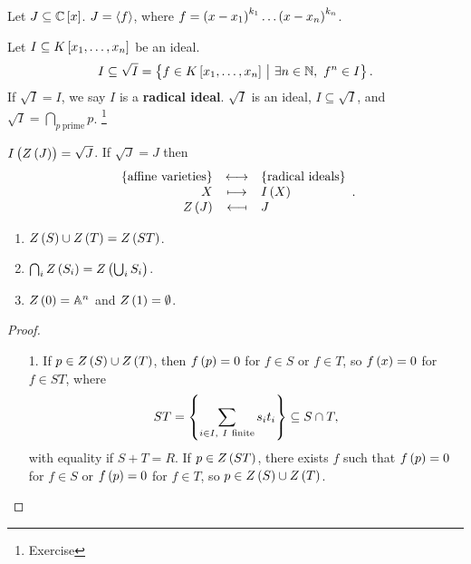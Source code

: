 \pagebreak

\begin{example}
Let $ J \subseteq \CC\sbr{x} $. $ J = \left\langle f \right\rangle $, where $ f = \br{x - x_1}^{k_1} \dots \br{x - x_n}^{k_n} $.
\end{example}

\begin{definition}
Let $ I \subseteq K\sbr{x_1, \dots, x_n} $ be an ideal.
$$ I \subseteq \sqrt{I} = \cbr{f \in K\sbr{x_1, \dots, x_n} \st \exists n \in \NN, \ f^n \in I}. $$
If $ \sqrt{I} = I $, we say $ I $ is a \textbf{radical ideal}. $ \sqrt{I} $ is an ideal, $ I \subseteq \sqrt{I} $, and $ \sqrt{I} = \bigcap_{p \ \text{prime}} p $. \footnote{Exercise}
\end{definition}

\begin{theorem}
$ I\br{Z\br{J}} = \sqrt{J} $. If $ \sqrt{J} = J $ then
$$
\begin{array}{rcl}
\cbr{\text{affine varieties}} & \longleftrightarrow & \cbr{\text{radical ideals}} \\
X & \longmapsto & I\br{X} \\
Z\br{J} & \longmapsfrom & J
\end{array}.
$$
\end{theorem}


\begin{proposition}
\hfill
\begin{enumerate}
\item $ Z\br{S} \cup Z\br{T} = Z\br{ST} $.
\item $ \bigcap_i Z\br{S_i} = Z\br{\bigcup_i S_i} $.
\item $ Z\br{0} = \AA^n $ and $ Z\br{1} = \emptyset $.
\end{enumerate}
\end{proposition}

\begin{proof}
\hfill
\begin{itemize}
\item[1.] If $ p \in Z\br{S} \cup Z\br{T} $, then $ f\br{p} = 0 $ for $ f \in S $ or $ f \in T $, so $ f\br{x} = 0 $ for $ f \in ST $, where
$$ ST = \cbr{\sum_{i \in I, \ I \ \text{finite}} s_it_i} \subseteq S \cap T, $$
with equality if $ S + T = R $. If $ p \in Z\br{ST} $, there exists $ f $ such that $ f\br{p} = 0 $ for $ f \in S $ or $ f\br{p} = 0 $ for $ f \in T $, so $ p \in Z\br{S} \cup Z\br{T} $.
\end{itemize}
\end{proof}

